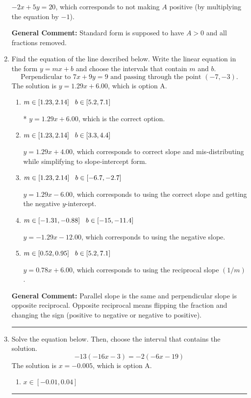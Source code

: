 \documentclass{extbook}[14pt]
\newcommand{\litem}[1]{\item #1

\rule{\textwidth}{0.4pt}}
\begin{document}
\begin{enumerate}
{\begin{enumerate}[label=\Alph*.]
 $-2x + 5y = 20$, which corresponds to not making $A$ positive (by multiplying the equation by $-1$).
\end{enumerate}

\textbf{General Comment:} Standard form is supposed to have $A > 0$ and all fractions removed.
}
\litem{
Find the equation of the line described below. Write the linear equation in the form $ y=mx+b $ and choose the intervals that contain $m$ and $b$.
\[ \text{Perpendicular to } 7 x + 9 y = 9 \text{ and passing through the point } (-7, -3). \]The solution is \( y = 1.29x + 6.00 \), which is option A.\begin{enumerate}[label=\Alph*.]
\item \( m \in [1.23, 2.14] \hspace*{3mm} b \in [5.2, 7.1] \)

* $y = 1.29x + 6.00$, which is the correct option.
\item \( m \in [1.23, 2.14] \hspace*{3mm} b \in [3.3, 4.4] \)

 $y = 1.29x + 4.00$, which corresponds to correct slope and mis-distributing while simplifying to slope-intercept form.
\item \( m \in [1.23, 2.14] \hspace*{3mm} b \in [-6.7, -2.7] \)

 $y = 1.29x - 6.00$, which corresponds to using the correct slope and getting the negative $y$-intercept.
\item \( m \in [-1.31, -0.88] \hspace*{3mm} b \in [-15, -11.4] \)

 $y = -1.29x - 12.00$, which corresponds to using the negative slope.
\item \( m \in [0.52, 0.95] \hspace*{3mm} b \in [5.2, 7.1] \)

 $y = 0.78x + 6.00$, which corresponds to using the reciprocal slope $(1/m)$.
\end{enumerate}

\textbf{General Comment:} Parallel slope is the same and perpendicular slope is opposite reciprocal. Opposite reciprocal means flipping the fraction and changing the sign (positive to negative or negative to positive).
}
\litem{
Solve the equation below. Then, choose the interval that contains the solution.
\[ -13(-16x -3) = -2(-6x -19) \]The solution is \( x = -0.005 \), which is option A.\begin{enumerate}[label=\Alph*.]
\item \( x \in [-0.01, 0.04] \)


\end{enumerate}}
\end{enumerate}
\end{document}

